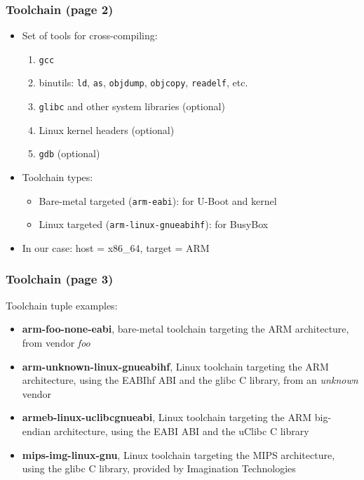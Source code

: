 \documentclass[aspectratio=169]{beamer}
\begin{document}
\begin{frame}
  \frametitle{Toolchain (page 2)}
  \begin{itemize}
    \item Set of tools for cross-compiling:
    \begin{enumerate}
      \item \texttt{gcc}
      \item binutils: \texttt{ld}, \texttt{as}, \texttt{objdump},
            \texttt{objcopy}, \texttt{readelf}, etc.
      \item \texttt{glibc} and other system libraries (\alert{optional})
      \item Linux kernel headers (\alert{optional})
      \item \texttt{gdb} (\alert{optional})
    \end{enumerate}
    \pause
    \item Toolchain types:
    \begin{itemize}
      \item Bare-metal targeted (\texttt{arm-eabi}): for U-Boot and kernel
      \item Linux targeted (\texttt{arm-linux-gnueabihf}): for BusyBox
    \end{itemize}
    \item In our case: host = x86\_64, target = ARM
  \end{itemize}
\end{frame}

\begin{frame}
  \frametitle{Toolchain (page 3)}
  Toolchain tuple examples:
  \begin{itemize}
  \item \textbf{arm-foo-none-eabi}, bare-metal toolchain targeting the ARM
        architecture, from vendor \textit{foo}
  \item \textbf{arm-unknown-linux-gnueabihf}, Linux toolchain targeting the ARM
        architecture, using the EABIhf ABI and the glibc C library, from an
        \textit{unknown} vendor
  \item \textbf{armeb-linux-uclibcgnueabi}, Linux toolchain targeting the ARM
        big-endian architecture, using the EABI ABI and the uClibc C library
  \item \textbf{mips-img-linux-gnu}, Linux toolchain targeting the MIPS
        architecture, using the glibc C library, provided by Imagination
        Technologies
  \end{itemize}
\end{frame}
\end{document}
